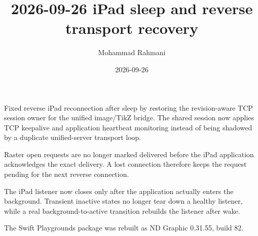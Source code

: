 \documentclass[a4paper]{article}
\title{2026-09-26 iPad sleep and reverse transport recovery}
\date{2026-09-26}
\author{Mohammad Rahmani}
\begin{document}
\maketitle
\begin{preview}
Fixed reverse iPad reconnection after sleep by restoring the revision-aware TCP session owner for the unified image/TikZ bridge. The shared session now applies TCP keepalive and application heartbeat monitoring instead of being shadowed by a duplicate unified-server transport loop.

Raster open requests are no longer marked delivered before the iPad application acknowledges the exact delivery. A lost connection therefore keeps the request pending for the next reverse connection.

The iPad listener now closes only after the application actually enters the background. Transient inactive states no longer tear down a healthy listener, while a real background-to-active transition rebuilds the listener after wake.

The Swift Playgrounds package was rebuilt as ND Graphic 0.31.55, build 82.
\end{preview}
\end{document}
